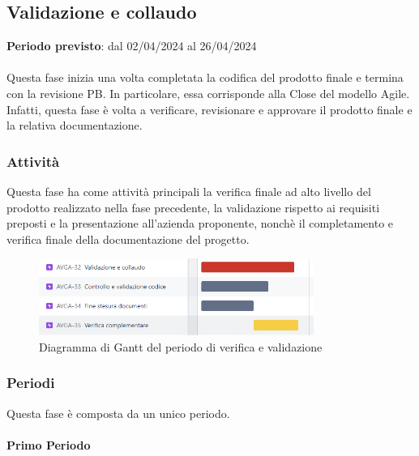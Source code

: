 
\subsection{Validazione e collaudo}\label{sec:pianificazione:val_collaudo}

\textbf{Periodo previsto}: dal 02/04/2024 al 26/04/2024\\\\
Questa fase inizia una volta completata la codifica del prodotto finale e termina con la revisione PB. In particolare, essa corrisponde alla Close del modello Agile. Infatti, questa fase è volta a verificare, revisionare e approvare il prodotto finale e la relativa documentazione.

\subsubsection{Attività}\label{sec:pianificazione:val_collaudo:attivita}
Questa fase ha come attività principali la verifica finale ad alto livello del prodotto realizzato nella fase precedente, la validazione rispetto ai requisiti preposti e la presentazione all'azienda proponente, nonchè il completamento e verifica finale della documentazione del progetto.

\begin{figure}[H]
    \centering
    \includegraphics[width=0.8\textwidth]{images/gantt_collaudo.PNG}
    \caption{Diagramma di Gantt del periodo di verifica e validazione}
    \label{fig:gantt_collaudo}
\end{figure}


\subsubsection{Periodi}\label{sec:pianificazione:val_collaudo:periodi}
Questa fase è composta da un unico periodo.

\paragraph{Primo Periodo}\label{sec:pianificazione:val_collaudo:periodi:primo}


